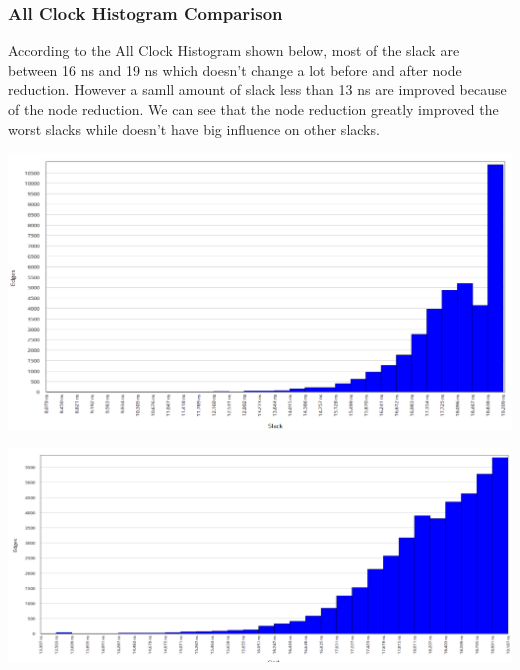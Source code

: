 \documentclass[letterpaper, 12pt]{article} %
\begin{document}
\subsubsection{All Clock Histogram Comparison}
According to the All Clock Histogram shown below, most of the slack are between 16 ns and 19 ns which doesn't change a lot before and after node reduction. However a samll amount of slack less than 13 ns are improved because of the node reduction. We can see that the node reduction greatly improved the worst slacks while doesn't have big influence on other slacks.\\ 
\begin{center}
\begin{minipage}{1.0\textwidth}
\centering
\includegraphics[width=15cm]{hist1.PNG}
\end{minipage}

\begin{minipage}{1.0\textwidth}
\centering
\includegraphics[width=15cm]{hist2.PNG}
\end{minipage}
\end{center}




\end{document}
